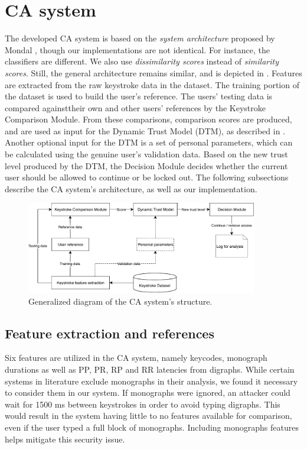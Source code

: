 \section{CA system}
\label{sec:system-design_CA-system}
The developed CA system is based on the \textit{system architecture} proposed by Mondal \cite{mondal}, though our implementations are not identical.
For instance, the classifiers are different. 
We also use \textit{dissimilarity scores} instead of \textit{similarity scores}.
Still, the general architecture remains similar, and is depicted in .
Features are extracted from the raw keystroke data in the dataset.
The training portion of the dataset is used to build the user's reference. 
The users' testing data is compared againsttheir own and other users' references by the Keystroke Comparison Module.
From these comparisons, comparison scores are produced, and are used as input for the Dynamic Trust Model (DTM), as described in .
Another optional input for the DTM is a set of personal parameters, which can be calculated using the genuine user's validation data.
Based on the new trust level produced by the DTM, the Decision Module decides whether the current user should be allowed to continue or be locked out.
The following subsections describe the CA system's architecture, as well as our implementation.

\begin{figure}[ht]
    \centering
    \includegraphics[width=0.9\textwidth]{figures/CA-diagram.pdf}
    \caption{Generalized diagram of the CA system's structure.}
    \label{fig:CA-diagram}
\end{figure}


\subsection{Feature extraction and references}
\label{sec:system-design-CA-ref}
Six features are utilized in the CA system, namely keycodes, monograph durations as well as PP, PR, RP and RR latencies from digraphs.
While certain systems in literature exclude monographs in their analysis, we found it necessary to consider them in our system.
If monographs were ignored, an attacker could wait for 1500 ms between keystrokes in order to avoid typing digraphs.
This would result in the system having little to no features available for comparison, even if the user typed a full block of monographs.
Including monographs features helps mitigate this security issue.

